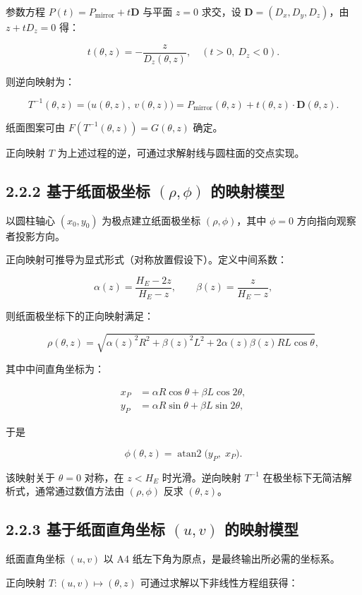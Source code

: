 \documentclass{ctexart}
\begin{document}
参数方程 $P(t)=P_{\text{mirror}}+t\mathbf{D}$ 与平面 $z=0$ 求交，设 $\mathbf{D}=(D_x,D_y,D_z)$，由 $z+tD_z=0$ 得：

\[
t(\theta,z)=-\frac{z}{D_z(\theta,z)},\quad (t>0,\ D_z<0).
\]

则逆向映射为：

\[
T^{-1}(\theta,z)=\bigl(u(\theta,z),\ v(\theta,z)\bigr)=P_{\text{mirror}}(\theta,z)+t(\theta,z)\cdot\mathbf{D}(\theta,z).
\]

纸面图案可由 $F(T^{-1}(\theta,z))=G(\theta,z)$ 确定。

正向映射 $T$ 为上述过程的逆，可通过求解射线与圆柱面的交点实现。

\subsection{2.2.2 基于纸面极坐标 $(\rho,\phi)$ 的映射模型}

以圆柱轴心 $(x_0,y_0)$ 为极点建立纸面极坐标 $(\rho,\phi)$，其中 $\phi=0$ 方向指向观察者投影方向。

正向映射可推导为显式形式（对称放置假设下）。定义中间系数：

\[
\alpha(z)=\frac{H_E-2z}{H_E-z},\qquad \beta(z)=\frac{z}{H_E-z},
\]

则纸面极坐标下的正向映射满足：

\[
\rho(\theta,z)=\sqrt{\alpha(z)^2 R^2+\beta(z)^2 L^2+2\alpha(z)\beta(z)RL\cos\theta},
\]

其中中间直角坐标为：

\[
\begin{aligned}
x_P &= \alpha R\cos\theta+\beta L\cos2\theta,\\
y_P &= \alpha R\sin\theta+\beta L\sin2\theta,
\end{aligned}
\]

于是

\[
\phi(\theta,z)=\operatorname{atan2}\!\bigl(y_P,\;x_P\bigr).
\]

该映射关于 $\theta=0$ 对称，在 $z<H_E$ 时光滑。逆向映射 $T^{-1}$ 在极坐标下无简洁解析式，通常通过数值方法由 $(\rho,\phi)$ 反求 $(\theta,z)$。

\subsection{2.2.3 基于纸面直角坐标 $(u,v)$ 的映射模型}

纸面直角坐标 $(u,v)$ 以 A4 纸左下角为原点，是最终输出所必需的坐标系。

正向映射 $T:(u,v)\mapsto(\theta,z)$ 可通过求解以下非线性方程组获得：
\end{document}
